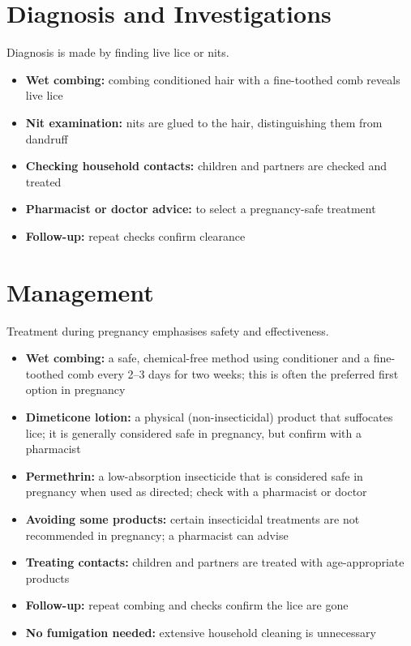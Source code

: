 \section*{Diagnosis and Investigations}
Diagnosis is made by finding live lice or nits.

\begin{itemize}
    \item \textbf{Wet combing:} combing conditioned hair with a fine-toothed comb reveals live lice
    \item \textbf{Nit examination:} nits are glued to the hair, distinguishing them from dandruff
    \item \textbf{Checking household contacts:} children and partners are checked and treated
    \item \textbf{Pharmacist or doctor advice:} to select a pregnancy-safe treatment
    \item \textbf{Follow-up:} repeat checks confirm clearance
\end{itemize}

\section*{Management}
Treatment during pregnancy emphasises safety and effectiveness.

\begin{itemize}
    \item \textbf{Wet combing:} a safe, chemical-free method using conditioner and a fine-toothed comb every 2--3 days for two weeks; this is often the preferred first option in pregnancy
    \item \textbf{Dimeticone lotion:} a physical (non-insecticidal) product that suffocates lice; it is generally considered safe in pregnancy, but confirm with a pharmacist
    \item \textbf{Permethrin:} a low-absorption insecticide that is considered safe in pregnancy when used as directed; check with a pharmacist or doctor
    \item \textbf{Avoiding some products:} certain insecticidal treatments are not recommended in pregnancy; a pharmacist can advise
    \item \textbf{Treating contacts:} children and partners are treated with age-appropriate products
    \item \textbf{Follow-up:} repeat combing and checks confirm the lice are gone
    \item \textbf{No fumigation needed:} extensive household cleaning is unnecessary
\end{itemize}

